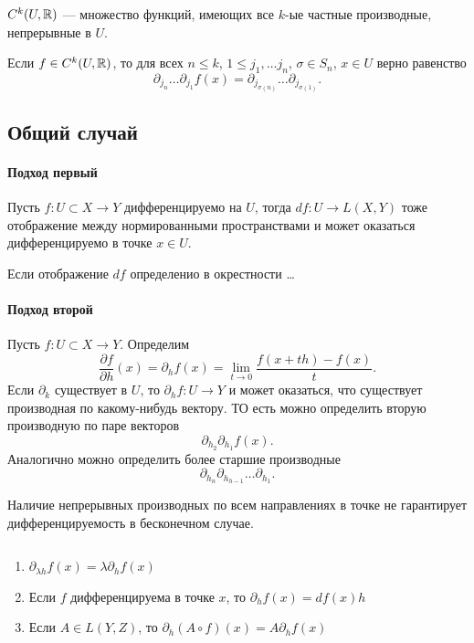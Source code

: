 \documentclass[11pt,dvipsnames]{report}
\begin{document}
\begin{defn}
    $ C^{k}(U, \mathbb{R})$ --- множество функций, имеющих все $ k$-ые частные производные, непрерывные в  $ U$.
\end{defn}
\begin{cor}
    Если $ f \in C^{k}(U , \mathbb{R})$, то для всех $ n \le k$, $ 1 \le  j_1, \ldots j_n$, $ \sigma \in S_n $, $ x \in U$ верно равенство
    \[
	\partial _{ j_n }\ldots \partial _{j_1}f(x) = \partial _{j_{ \sigma (n)}}\ldots \partial _{j _{   \sigma (1)}}
    .\] 
\end{cor}
\subsection{Общий случай}
\paragraph{Подход первый}
Пусть $ f\colon  U \subset X \to  Y$ дифференцируемо на $ U$, тогда  $ df \colon U \to  L(X, Y)$ тоже отображение между нормированными пространствами и может оказаться дифференцируемо в точке $ x \in U$. 
\begin{defn}
    Если отображение $ df$ определенио в окрестности \ldots 
\end{defn}
\paragraph{Подход второй}
\begin{defn}
    Пусть $ f\colon U \subset  X \to  Y$. Определим
    \[
	\frac{\partial f}{\partial h}(x) = \partial _h f(x) = \lim_{t \to  0} \frac{f(x+th) - f(x)}{t} 
    .\] 
    Если $ \partial _k$ существует в $ U$, то  $ \partial _h f \colon U \to  Y$ и может оказаться, что существует производная по какому-нибудь вектору. ТО есть можно определить вторую производную по паре векторов
    \[
	\partial _{h_2} \partial _{h_1}f(x)
    .\] 
    Аналогично можно определить более старшие производные
    \[
    \partial _{ h_n } \partial _{h_{h-1}} \ldots  \partial _{h_1}
    .\] 
\end{defn}
\begin{note}
    Наличие непрерывных производных по всем направлениях в точке не гарантирует дифференцируемость в бесконечном случае.
\end{note}
\begin{prop}
    $ $
    \begin{enumerate}[noitemsep]
	\item $ \partial _{\lambda h}f(x) = \lambda \partial_h f(x)$
	\item Если $ f$ дифференцируема в точке  $ x$, то  $ \partial _h f(x) = df(x) h$
	\item Если $ A \in L(Y, Z) $, то $ \partial _h (A \circ f) (x) = A\partial _h f(x)$
    \end{enumerate}
\end{prop}
\end{document}
